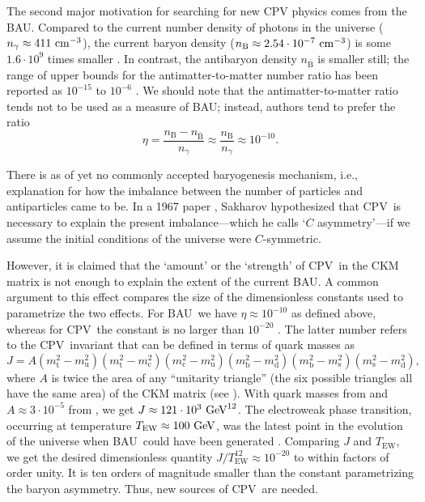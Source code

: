 The second major motivation for searching for new \gls{CPV} physics comes from
the \gls{BAU}. Compared to the current number density of photons in the universe
($n_\gamma \approx411~\mathrm{cm}^{-3}$), the current baryon density
($n_\text{B}\approx2.54\cdot 10^{-7}~\mathrm{cm}^{-3}$) is some $1.6\cdot10^{9}$ times
smaller \cite[Table 17]{bennett2013nine}. In contrast, the antibaryon density
$n_{\bar{\text{B}}}$ is smaller still; the range of upper bounds for the
antimatter-to-matter number ratio has been reported as $10^{-15}$ to $10^{-6}$
\cite{canetti2012matter}. We should note that the antimatter-to-matter ratio
tends not to be used as a measure of \gls{BAU}; instead, authors tend to prefer
the ratio
%
\begin{equation}
\eta =
    \frac{n_\text{B}-n_{\bar{\text{B}}}}{n_{\gamma }}
   \approx
    \frac{n_\text{B}}{n_{\gamma }}
   \approx 10^{-10}.
\end{equation}

There is as of yet no commonly accepted baryogenesis mechanism, i.e.,
explanation for how the imbalance between the number of particles and
antiparticles came to be. In a 1967 paper \cite{sakharov1991violation}, Sakharov
hypothesized that \gls{CPV}\ is necessary to explain the present
imbalance---which he calls `$C$ asymmetry'---if we assume the initial conditions
of the universe were $C$-symmetric.

However, it is claimed that the `amount' or the `strength' of \gls{CPV}\ in the
\gls{CKM} matrix is not enough to explain the extent of the current \gls{BAU}. A
common argument to this effect compares the size of the dimensionless constants
used to parametrize the two effects. For \gls{BAU}\ we have
$\eta\approx10^{-10}$ as defined above, whereas for \gls{CPV}\ the constant is
no larger than $10^{-20}$ \cite[sect 2.3]{riotto1999recent}. The latter number
refers to the \gls{CPV}\ invariant that can be defined in terms of quark masses
as \cite[eqn~3]{hou2011source}
%
\begin{equation}
   J = A(m_\text{t}^2 - m_\text{u}^2)
        (m_\text{t}^2 - m_\text{c}^2)
        (m_\text{c}^2 - m_\text{u}^2)
        (m_\text{b}^2 - m_\text{d}^2)
        (m_\text{b}^2 - m_\text{s}^2)
        (m_\text{s}^2 - m_\text{d}^2),
\end{equation}
%
where $A$ is twice the area of any ``unitarity triangle'' (the six possible
triangles all have the same area) of the \gls{CKM} matrix (see \cite[fig
12.1]{PDG16}). With quark masses from \cite[p40, ``Quark Summary Table'']{PDG16}
and $A\approx3\cdot10^{-5}$ from \cite[p7]{kleinknecht2006unitarity}, we get
$J\approx121\cdot 10^3~\mathrm{GeV}^{12}$.  The electroweak phase transition, occurring
at temperature $T_\text{EW}\approx100~\mathrm{GeV}$, was the latest point in the
evolution of the universe when \gls{BAU}\ could have been generated
\cite{fodor2000EW}. Comparing $J$ and $T_\text{EW}$, we get the desired
dimensionless quantity $J/T_\text{EW}^{12}\approx10^{-20}$ to within factors of
order unity. It is ten orders of magnitude smaller than the constant
parametrizing the baryon asymmetry. Thus, new sources of \gls{CPV}\ are needed.

